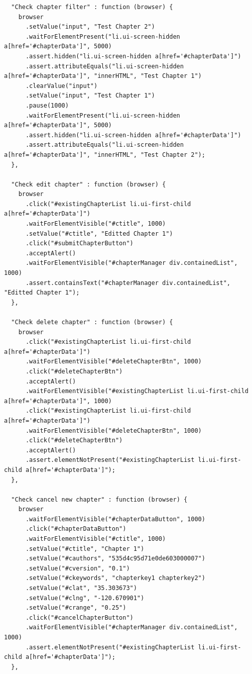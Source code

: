 \documentclass[12pt]{ucthesis}
\begin{document}
\begin{lstlisting}
  "Check chapter filter" : function (browser) {
    browser
      .setValue("input", "Test Chapter 2")
      .waitForElementPresent("li.ui-screen-hidden a[href='#chapterData']", 5000)
      .assert.hidden("li.ui-screen-hidden a[href='#chapterData']")
      .assert.attributeEquals("li.ui-screen-hidden a[href='#chapterData']", "innerHTML", "Test Chapter 1")
      .clearValue("input")
      .setValue("input", "Test Chapter 1")
      .pause(1000)
      .waitForElementPresent("li.ui-screen-hidden a[href='#chapterData']", 5000)
      .assert.hidden("li.ui-screen-hidden a[href='#chapterData']")
      .assert.attributeEquals("li.ui-screen-hidden a[href='#chapterData']", "innerHTML", "Test Chapter 2");
  },

  "Check edit chapter" : function (browser) {
    browser
      .click("#existingChapterList li.ui-first-child a[href='#chapterData']")
      .waitForElementVisible("#ctitle", 1000)
      .setValue("#ctitle", "Editted Chapter 1")
      .click("#submitChapterButton")
      .acceptAlert()
      .waitForElementVisible("#chapterManager div.containedList", 1000)
      .assert.containsText("#chapterManager div.containedList", "Editted Chapter 1");
  },

  "Check delete chapter" : function (browser) {
    browser
      .click("#existingChapterList li.ui-first-child a[href='#chapterData']")
      .waitForElementVisible("#deleteChapterBtn", 1000)
      .click("#deleteChapterBtn")
      .acceptAlert()
      .waitForElementVisible("#existingChapterList li.ui-first-child a[href='#chapterData']", 1000)
      .click("#existingChapterList li.ui-first-child a[href='#chapterData']")
      .waitForElementVisible("#deleteChapterBtn", 1000)
      .click("#deleteChapterBtn")
      .acceptAlert()
      .assert.elementNotPresent("#existingChapterList li.ui-first-child a[href='#chapterData']");
  },

  "Check cancel new chapter" : function (browser) {
    browser
      .waitForElementVisible("#chapterDataButton", 1000)
      .click("#chapterDataButton")
      .waitForElementVisible("#ctitle", 1000)
      .setValue("#ctitle", "Chapter 1")
      .setValue("#cauthors", "535d4c95d71e0de603000007")
      .setValue("#cversion", "0.1")
      .setValue("#ckeywords", "chapterkey1 chapterkey2")
      .setValue("#clat", "35.303673")
      .setValue("#clng", "-120.670901")
      .setValue("#crange", "0.25")
      .click("#cancelChapterButton")
      .waitForElementVisible("#chapterManager div.containedList", 1000)
      .assert.elementNotPresent("#existingChapterList li.ui-first-child a[href='#chapterData']");
  },


\end{lstlisting}
\end{document}
